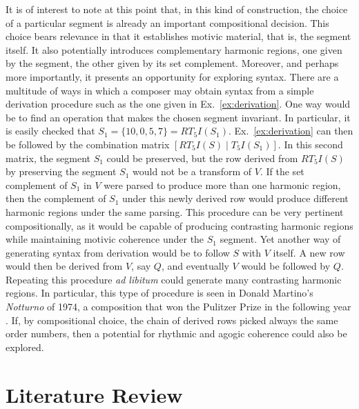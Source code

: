 It is of interest to note at this point that, in this kind of construction, the choice of a particular segment is already an important compositional decision. This choice bears relevance in that it establishes motivic material, that is, the segment itself. It also potentially introduces complementary harmonic regions, one given by the segment, the other given by its set complement. Moreover, and perhaps more importantly, it presents an opportunity for exploring syntax. There are a multitude of ways in which a composer may obtain syntax from a simple derivation procedure such as the one given in Ex.~\ref{ex:derivation}. One way would be to find an operation that makes the chosen segment invariant. In particular, it is easily checked that $S_1 = \{ 10, 0, 5, 7 \} = RT_5I(S_1)$. Ex.~\ref{ex:derivation} can then be followed by the combination matrix $[RT_5I(S) \; | \; T_5I(S_1)]$. In this second matrix, the segment $S_1$ could be preserved, but the row derived from $RT_5I(S)$ by preserving the segment $S_1$ would not be a transform of $V$. If the set complement of $S_1$ in $V$ were parsed to produce more than one harmonic region, then the complement of $S_1$ under this newly derived row would produce different harmonic regions under the same parsing. This procedure can be very pertinent compositionally, as it would be capable of producing contrasting harmonic regions while maintaining motivic coherence under the $S_1$ segment. Yet another way of generating syntax from derivation would be to follow $S$ with $V$ itself. A new row would then be derived from $V$, say $Q$, and eventually $V$ would be followed by $Q$. Repeating this procedure \emph{ad libitum} could generate many contrasting harmonic regions. In particular, this type of procedure is seen in Donald Martino's \emph{Notturno} of 1974, a composition that won the Pulitzer Prize in the following year \cite[181]{Starr1984}. If, by compositional choice, the chain of derived rows picked always the same order numbers, then a potential for rhythmic and agogic coherence could also be explored.

\section{Literature Review}

